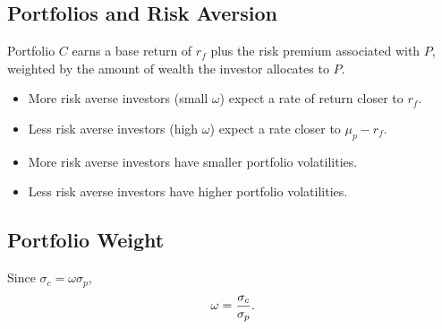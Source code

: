 \documentclass[letterpaper,10pt,english]{sphinxmanual}
\begin{document}
\subsection{Portfolios and Risk Aversion}
\label{allocation:portfolios-and-risk-aversion}
Portfolio $C$ earns a base return of $r_f$ plus the risk
premium associated with $P$, weighted by the amount of wealth
the investor allocates to $P$.
\begin{itemize}
\item {} 
More risk averse investors (small $\omega$) expect a rate of
return closer to $r_f$.

\end{itemize}
\begin{itemize}
\item {} 
Less risk averse investors (high $\omega$) expect a rate
closer to $\mu_p - r_f$.

\end{itemize}
\begin{itemize}
\item {} 
More risk averse investors have smaller portfolio volatilities.

\end{itemize}
\begin{itemize}
\item {} 
Less risk averse investors have higher portfolio volatilities.

\end{itemize}


\subsection{Portfolio Weight}
\label{allocation:portfolio-weight}
Since $\sigma_c = \omega \sigma_p$,
\begin{gather}
\begin{split}\omega =\frac{\sigma_c}{\sigma_p}.\end{split}\notag
\end{gather}
\end{document}
